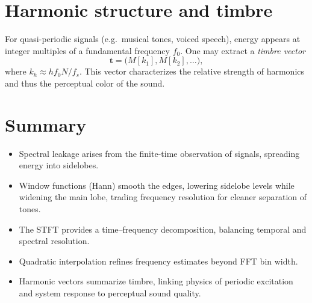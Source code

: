 \documentclass[11pt]{article}
\begin{document}
\section*{Harmonic structure and timbre}
For quasi-periodic signals (e.g.\ musical tones, voiced speech), energy appears at integer multiples
of a fundamental frequency $f_0$. One may extract a \emph{timbre vector}
\begin{equation}
    \bm{t}=\big(M[k_1],M[k_2],\dots\big),
\end{equation}
where $k_h\approx h f_0 N/f_s$. This vector characterizes the relative strength of harmonics and
thus the perceptual color of the sound.

\section*{Summary}
\begin{itemize}
    \item Spectral leakage arises from the finite-time observation of signals, spreading energy into
          sidelobes.
    \item Window functions (Hann) smooth the edges, lowering sidelobe levels while widening the main lobe,
          trading frequency resolution for cleaner separation of tones.
    \item The STFT provides a time--frequency decomposition, balancing temporal and spectral resolution.
    \item Quadratic interpolation refines frequency estimates beyond FFT bin width.
    \item Harmonic vectors summarize timbre, linking physics of periodic excitation and system response
          to perceptual sound quality.
\end{itemize}
\end{document}

